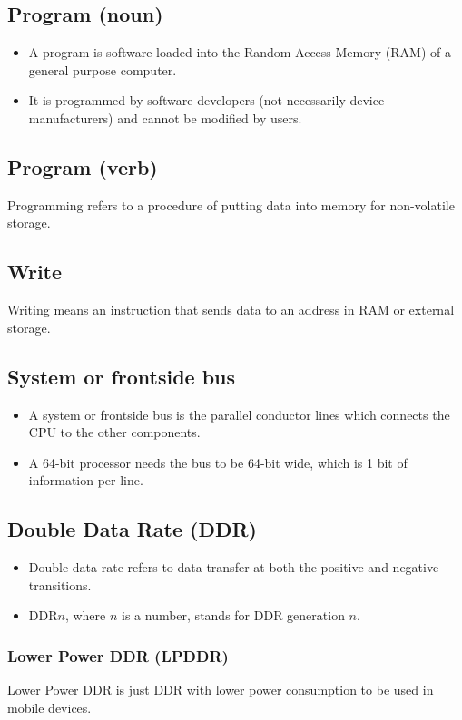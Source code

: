 \documentclass[11pt]{article}
\begin{document}
\subsection{Program (noun)}
\label{sec:org09869c4}
\begin{itemize}
\item A program is software loaded into the Random Access Memory (RAM) of a general purpose computer.
\item It is programmed by software developers (not necessarily device manufacturers) and cannot be modified by users.
\end{itemize}
\subsection{Program (verb)}
\label{sec:orga18a5d3}
Programming refers to a procedure of putting data into memory for non-volatile storage.
\subsection{Write}
\label{sec:orga58c39a}
Writing means an instruction that sends data to an address in RAM or external storage.
\subsection{System or frontside bus}
\label{sec:org042afb6}
\begin{itemize}
\item A system or frontside bus is the parallel conductor lines which connects the CPU to the other components.
\item A 64-bit processor needs the bus to be 64-bit wide, which is 1 bit of information per line.
\end{itemize}
\subsection{Double Data Rate (DDR)}
\label{sec:org5e4949c}
\begin{itemize}
\item Double data rate refers to data transfer at both the positive and negative transitions.
\item DDR\(n\), where \(n\) is a number, stands for DDR generation \(n\).
\end{itemize}
\subsubsection{Lower Power DDR (LPDDR)}
\label{sec:org62b2dcb}
Lower Power DDR is just DDR with lower power consumption to be used in mobile devices.
\end{document}
